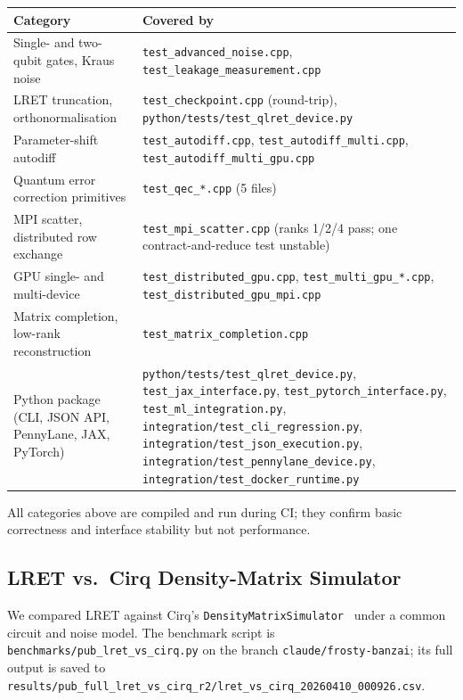 \documentclass[11pt,a4paper]{article}
\begin{document}
\begin{center}
\renewcommand{\arraystretch}{1.25}
\begin{tabular}{@{}lp{8.5cm}@{}}
\toprule
\textbf{Category} & \textbf{Covered by} \\
\midrule
Single- and two-qubit gates, Kraus noise &
  \texttt{test\_advanced\_noise.cpp}, \texttt{test\_leakage\_measurement.cpp} \\
LRET truncation, orthonormalisation &
  \texttt{test\_checkpoint.cpp} (round-trip), \texttt{python/tests/test\_qlret\_device.py} \\
Parameter-shift autodiff &
  \texttt{test\_autodiff.cpp}, \texttt{test\_autodiff\_multi.cpp},
  \texttt{test\_autodiff\_multi\_gpu.cpp} \\
Quantum error correction primitives &
  \texttt{test\_qec\_*.cpp} (5 files) \\
MPI scatter, distributed row exchange &
  \texttt{test\_mpi\_scatter.cpp} (ranks 1/2/4 pass; one contract-and-reduce test
  unstable) \\
GPU single- and multi-device &
  \texttt{test\_distributed\_gpu.cpp}, \texttt{test\_multi\_gpu\_*.cpp},
  \texttt{test\_distributed\_gpu\_mpi.cpp} \\
Matrix completion, low-rank reconstruction &
  \texttt{test\_matrix\_completion.cpp} \\
Python package (CLI, JSON API, PennyLane, JAX, PyTorch) &
  \texttt{python/tests/test\_qlret\_device.py}, \texttt{test\_jax\_interface.py},
  \texttt{test\_pytorch\_interface.py}, \texttt{test\_ml\_integration.py},
  \texttt{integration/test\_cli\_regression.py}, \texttt{integration/test\_json\_execution.py},
  \texttt{integration/test\_pennylane\_device.py}, \texttt{integration/test\_docker\_runtime.py} \\
\bottomrule
\end{tabular}
\end{center}

All categories above are compiled and run during CI; they confirm basic correctness
and interface stability but not performance.

\subsection{LRET vs.\ Cirq Density-Matrix Simulator}
\label{sec:bench}

We compared LRET against Cirq's \texttt{DensityMatrixSimulator}~\cite{cirq} under a
common circuit and noise model. The benchmark script is
\texttt{benchmarks/pub\_lret\_vs\_cirq.py} on the branch
\texttt{claude/frosty-banzai}; its full output is saved to
\texttt{results/pub\_full\_lret\_vs\_cirq\_r2/lret\_vs\_cirq\_20260410\_000926.csv}.
\end{document}
